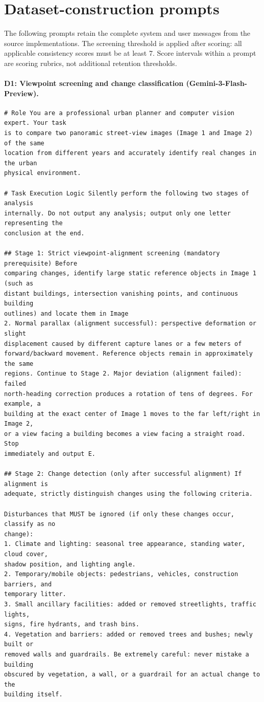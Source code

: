 \section{Dataset-construction prompts}
The following prompts retain the complete system and user messages from the source implementations. The screening threshold is applied after scoring: all applicable consistency scores must be at least 7. Score intervals within a prompt are scoring rubrics, not additional retention thresholds.

\paragraph{D1: Viewpoint screening and change classification (Gemini-3-Flash-Preview).}
\begingroup\fontsize{8}{10}\selectfont
\begin{promptbox}
\begin{verbatim}
# Role You are a professional urban planner and computer vision expert. Your task
is to compare two panoramic street-view images (Image 1 and Image 2) of the same
location from different years and accurately identify real changes in the urban
physical environment.

# Task Execution Logic Silently perform the following two stages of analysis
internally. Do not output any analysis; output only one letter representing the
conclusion at the end.

## Stage 1: Strict viewpoint-alignment screening (mandatory prerequisite) Before
comparing changes, identify large static reference objects in Image 1 (such as
distant buildings, intersection vanishing points, and continuous building
outlines) and locate them in Image
2. Normal parallax (alignment successful): perspective deformation or slight
displacement caused by different capture lanes or a few meters of
forward/backward movement. Reference objects remain in approximately the same
regions. Continue to Stage 2. Major deviation (alignment failed): failed
north-heading correction produces a rotation of tens of degrees. For example, a
building at the exact center of Image 1 moves to the far left/right in Image 2,
or a view facing a building becomes a view facing a straight road. Stop
immediately and output E.

## Stage 2: Change detection (only after successful alignment) If alignment is
adequate, strictly distinguish changes using the following criteria.

Disturbances that MUST be ignored (if only these changes occur, classify as no
change):
1. Climate and lighting: seasonal tree appearance, standing water, cloud cover,
shadow position, and lighting angle.
2. Temporary/mobile objects: pedestrians, vehicles, construction barriers, and
temporary litter.
3. Small ancillary facilities: added or removed streetlights, traffic lights,
signs, fire hydrants, and trash bins.
4. Vegetation and barriers: added or removed trees and bushes; newly built or
removed walls and guardrails. Be extremely careful: never mistake a building
obscured by vegetation, a wall, or a guardrail for an actual change to the
building itself.


\end{verbatim}
\end{promptbox}
